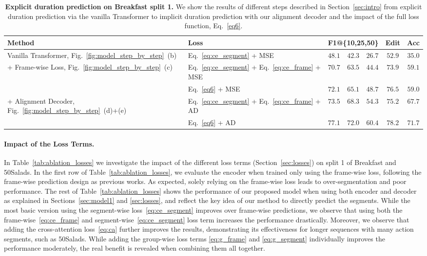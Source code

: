 \begin{table}[h]
\centering
\caption{\textbf{Explicit duration prediction on Breakfast split 1.}
We show the results of different steps described in Section~\ref{sec:intro} from explicit duration prediction via the vanilla Transformer to implicit duration prediction with our alignment decoder and the impact of the full loss function, Eq.~\eqref{eq6}.}
\label{tab:expl_dur}
\resizebox{4.0 in}{!} {
\begin{tabular}{ll|ccc|c|c}
\hline 
\hline 
Method & Loss & \multicolumn{3}{c|}{F1@\{10,25,50\}} & Edit & Acc \\
\hline 
Vanilla Transformer, Fig.~\ref{fig:model_step_by_step}~(b) & Eq.~\eqref{eq:ce_segment} + MSE & $48.1$ & $42.3$ & $26.7$ & $52.9$ & $35.0$ \\
\hline
\multirow{2}{*}{+ Frame-wise Loss, Fig.~\ref{fig:model_step_by_step}~(c) } & Eq.~\eqref{eq:ce_segment} + Eq.~\eqref{eq:ce_frame} + MSE 
& $70.7$ & $63.5$ & $44.4$ & $73.9$ & $59.1$ \\
& Eq.~\eqref{eq6} + MSE & $72.1$ & $65.1$ & $48.7$ & $76.5$ & $59.0$ \\
\hline
\multirow{2}{*}{+ Alignment Decoder, Fig.~\ref{fig:model_step_by_step}~(d)+(e)} & Eq.~\eqref{eq:ce_segment} + Eq.~\eqref{eq:ce_frame} + AD & $73.5$ & $68.3$ & $54.3$ & $75.2$ & $67.7$ \\
& Eq.~\eqref{eq6} + AD & $77.1$ & $72.0$ & $60.4$ & $78.2$ & $71.7$ \\
\hline 
\hline 
\end{tabular}
}
\end{table}


\paragraph{Impact of the Loss Terms.}
In Table~\ref{tab:ablation_losses} we investigate the impact of the different loss terms (Section~\ref{sec:losses}) on split 1 of Breakfast and 50Salads.
In the first row of Table~\ref{tab:ablation_losses}, we evaluate the encoder when trained only using the frame-wise loss, \ie following the frame-wise prediction design as previous works. As expected, solely relying on the frame-wise loss leads to over-segmentation and poor performance. The rest of Table~\ref{tab:ablation_losses} shows the performance of our proposed model when using both encoder and decoder as explained in Sections~\ref{sec:model1} and \ref{sec:losses}, and reflect the key idea of our method to directly predict the segments.
While the most basic version using the segment-wise loss~\eqref{eq:ce_segment} improves over frame-wise predictions, we observe that using both the frame-wise~\eqref{eq:ce_frame} and segment-wise~\eqref{eq:ce_segment} loss term increases the performance drastically.
Moreover, we observe that adding the cross-attention loss~\eqref{eq:ca} further improves the results, demonstrating its effectiveness for longer sequences with many action segments, such as 50Salads.
While adding the group-wise loss terms \eqref{eq:g_frame} and \eqref{eq:g_segment} individually improves the performance moderately, the real benefit is revealed when combining them all together.

